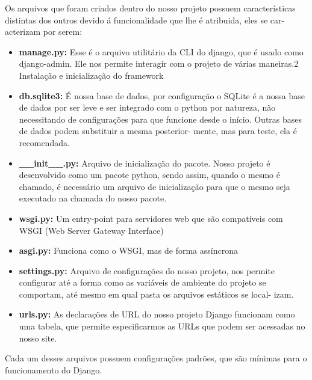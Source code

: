 \documentclass[12pt, a4paper]{paper}
\begin{document}
Os arquivos que foram criados dentro do nosso projeto possuem características
distintas dos outros devido á funcionalidade que lhe é atribuida, eles se car-
acterizam por serem:
\begin{itemize}
  \item \textbf{manage.py:} Esse é o arquivo utilitário da CLI do django, que é usado
como django-admin. Ele nos permite interagir com o projeto de várias
maneiras.2 Instalação e inicialização do framework

  \item \textbf{db.sqlite3:} É nossa base de dados, por configuração o SQLite é a
nossa base de dados por ser leve e ser integrado com o python por
natureza, não necessitando de configurações para que funcione desde
o início. Outras bases de dados podem substituir a mesma posterior-
mente, mas para teste, ela é recomendada.

  \item \textbf{\_\_init\_\_.py:} Arquivo de inicialização do pacote. Nosso projeto é
desenvolvido como um pacote python, sendo assim, quando o mesmo é
chamado, é necessário um arquivo de inicialização para que o mesmo
seja executado na chamada do nosso pacote.

  \item \textbf{wsgi.py:} Um entry-point para servidores web que são compatíveis
com WSGI (Web Server Gateway Interface)

  \item \textbf{asgi.py:} Funciona como o WSGI, mas de forma assíncrona

  \item \textbf{settings.py:} Arquivo de configurações do nosso projeto, nos permite
configurar até a forma como as variáveis de ambiente do projeto se
comportam, até mesmo em qual pasta os arquivos estáticos se local-
izam.

  \item \textbf{urls.py:} As declarações de URL do nosso projeto Django funcionam
como uma tabela, que permite especificarmos as URLs que podem ser
acessadas no nosso site.
\end{itemize}

Cada um desses arquivos possuem configurações padrões, que são mínimas
para o funcionamento do Django.
\end{document}
